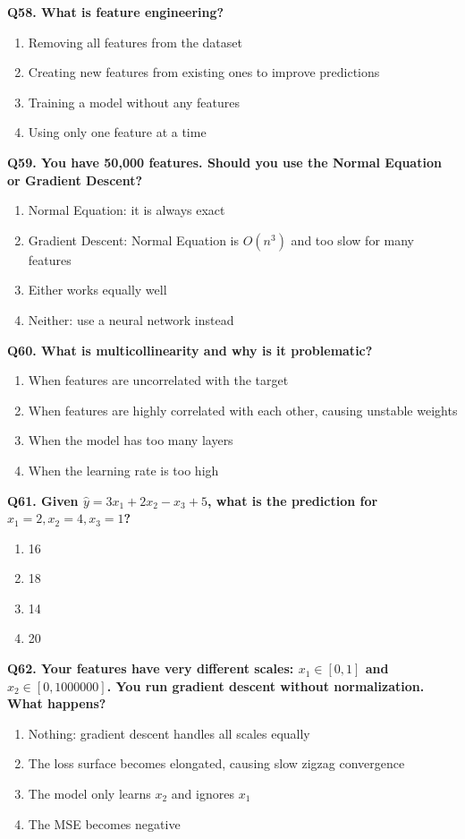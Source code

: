 \documentclass[12pt, a4paper]{article}
\newcommand{\question}[1]{\vspace{0.6em}\noindent\textbf{#1}}
\begin{document}
\question{Q58. What is feature engineering?}
\begin{enumerate}[label=\alph*)]
    \item Removing all features from the dataset
    \item Creating new features from existing ones to improve predictions
    \item Training a model without any features
    \item Using only one feature at a time
\end{enumerate}

\question{Q59. You have 50,000 features. Should you use the Normal Equation or Gradient Descent?}
\begin{enumerate}[label=\alph*)]
    \item Normal Equation: it is always exact
    \item Gradient Descent: Normal Equation is $O(n^3)$ and too slow for many features
    \item Either works equally well
    \item Neither: use a neural network instead
\end{enumerate}

\question{Q60. What is multicollinearity and why is it problematic?}
\begin{enumerate}[label=\alph*)]
    \item When features are uncorrelated with the target
    \item When features are highly correlated with each other, causing unstable weights
    \item When the model has too many layers
    \item When the learning rate is too high
\end{enumerate}

\question{Q61. Given $\hat{y} = 3x_1 + 2x_2 - x_3 + 5$, what is the prediction for $x_1=2, x_2=4, x_3=1$?}
\begin{enumerate}[label=\alph*)]
    \item 16
    \item 18
    \item 14
    \item 20
\end{enumerate}

\question{Q62. Your features have very different scales: $x_1 \in [0,1]$ and $x_2 \in [0, 1000000]$. You run gradient descent without normalization. What happens?}
\begin{enumerate}[label=\alph*)]
    \item Nothing: gradient descent handles all scales equally
    \item The loss surface becomes elongated, causing slow zigzag convergence
    \item The model only learns $x_2$ and ignores $x_1$
    \item The MSE becomes negative
\end{enumerate}
\end{document}
